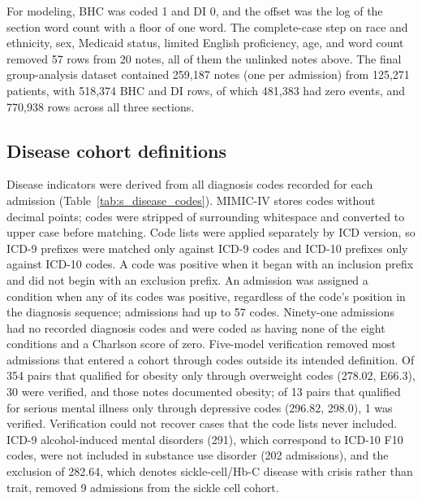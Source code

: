\documentclass[unnumsec,webpdf,contemporary,large]{oup-authoring-template}
\begin{document}
For modeling, BHC was coded 1 and DI 0, and the offset was the log of the section word count with a floor of one word. The complete-case step on race and ethnicity, sex, Medicaid status, limited English proficiency, age, and word count removed 57 rows from 20 notes, all of them the unlinked notes above. The final group-analysis dataset contained 259,187 notes (one per admission) from 125,271 patients, with 518,374 BHC and DI rows, of which 481,383 had zero events, and 770,938 rows across all three sections.

\subsection{Disease cohort definitions}

Disease indicators were derived from all diagnosis codes recorded for each admission (Table~\ref{tab:s_disease_codes}). MIMIC-IV stores codes without decimal points; codes were stripped of surrounding whitespace and converted to upper case before matching. Code lists were applied separately by ICD version, so ICD-9 prefixes were matched only against ICD-9 codes and ICD-10 prefixes only against ICD-10 codes. A code was positive when it began with an inclusion prefix and did not begin with an exclusion prefix. An admission was assigned a condition when any of its codes was positive, regardless of the code's position in the diagnosis sequence; admissions had up to 57 codes. Ninety-one admissions had no recorded diagnosis codes and were coded as having none of the eight conditions and a Charlson score of zero.
Five-model verification removed most admissions that entered a cohort through codes outside its intended definition. Of 354 pairs that qualified for obesity only through overweight codes (278.02, E66.3), 30 were verified, and those notes documented obesity; of 13 pairs that qualified for serious mental illness only through depressive codes (296.82, 298.0), 1 was verified. Verification could not recover cases that the code lists never included. ICD-9 alcohol-induced mental disorders (291), which correspond to ICD-10 F10 codes, were not included in substance use disorder (202 admissions), and the exclusion of 282.64, which denotes sickle-cell/Hb-C disease with crisis rather than trait, removed 9 admissions from the sickle cell cohort.
\end{document}
